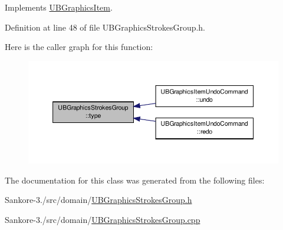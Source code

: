Implements \hyperlink{class_u_b_graphics_item_acab0781401cac08c9ad99b0cd0fa8480}{U\-B\-Graphics\-Item}.



Definition at line 48 of file U\-B\-Graphics\-Strokes\-Group.\-h.



Here is the caller graph for this function\-:
\nopagebreak
\begin{figure}[H]
\begin{center}
\leavevmode
\includegraphics[width=350pt]{d3/d0b/class_u_b_graphics_strokes_group_a6ae2ff9eb80bae962b6befc61278fcb7_icgraph}
\end{center}
\end{figure}




The documentation for this class was generated from the following files\-:\begin{DoxyCompactItemize}
\item 
Sankore-\/3./src/domain/\hyperlink{_u_b_graphics_strokes_group_8h}{U\-B\-Graphics\-Strokes\-Group.\-h}\item 
Sankore-\/3./src/domain/\hyperlink{_u_b_graphics_strokes_group_8cpp}{U\-B\-Graphics\-Strokes\-Group.\-cpp}\end{DoxyCompactItemize}
